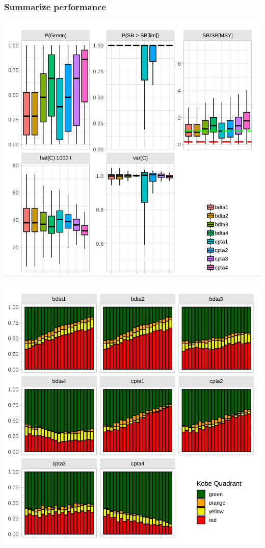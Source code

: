 \documentclass{beamer}\usepackage[]{graphicx}\usepackage[]{xcolor}
\begin{document}
\begin{frame}
\frametitle{Summarize performance}

\begin{center}
\includegraphics[height=0.5\textheight]{figs/perf1.png}
\end{center}

\begin{center}
\includegraphics[height=0.5\textheight]{figs/perf2.png}
\end{center}

\end{frame}
\end{document}
